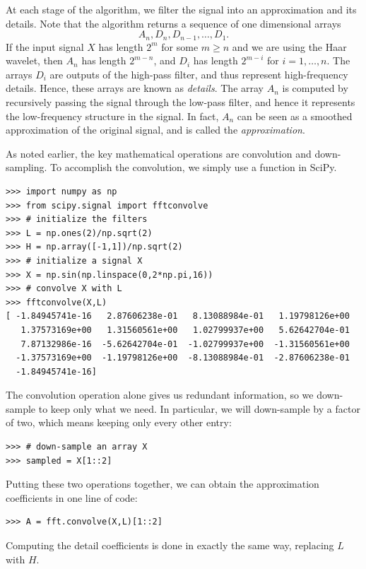 At each stage of the algorithm, we filter the signal into an approximation and its details.
Note that the algorithm returns a sequence of one dimensional arrays
\[A_n, D_n, D_{n-1}, \ldots, D_1.\]
If the input signal $X$ has length $2^m$ for
some $m \geq n$ and we are using the Haar wavelet, then $A_n$ has length $2^{m-n}$, and $D_i$ has length $2^{m-i}$
for $i=1,\ldots,n$. The arrays $D_i$ are outputs of the high-pass filter, and thus represent high-frequency
details.
Hence, these arrays are known as \emph{details}.
The array $A_n$ is computed by recursively passing the signal through the low-pass filter, and hence it
represents the low-frequency structure in the signal.
In fact, $A_n$ can be seen as a smoothed approximation of the original signal, and is called the \emph{approximation}.

As noted earlier, the key mathematical operations are convolution and down-sampling.
To accomplish the convolution, we simply use a function in SciPy.
\begin{lstlisting}
>>> import numpy as np
>>> from scipy.signal import fftconvolve
>>> # initialize the filters
>>> L = np.ones(2)/np.sqrt(2)
>>> H = np.array([-1,1])/np.sqrt(2)
>>> # initialize a signal X
>>> X = np.sin(np.linspace(0,2*np.pi,16))
>>> # convolve X with L
>>> fftconvolve(X,L)
[ -1.84945741e-16   2.87606238e-01   8.13088984e-01   1.19798126e+00
   1.37573169e+00   1.31560561e+00   1.02799937e+00   5.62642704e-01
   7.87132986e-16  -5.62642704e-01  -1.02799937e+00  -1.31560561e+00
  -1.37573169e+00  -1.19798126e+00  -8.13088984e-01  -2.87606238e-01
  -1.84945741e-16]
\end{lstlisting}
The convolution operation alone gives us redundant information, so we down-sample to keep only what we need.
In particular, we will down-sample by a factor
of two, which means keeping only every other entry:
\begin{lstlisting}
>>> # down-sample an array X
>>> sampled = X[1::2]
\end{lstlisting}
Putting these two operations together, we can obtain the approximation coefficients in one
line of code:
\begin{lstlisting}
>>> A = fft.convolve(X,L)[1::2]
\end{lstlisting}
Computing the detail coefficients is done in exactly the same way, replacing $L$ with $H$.
